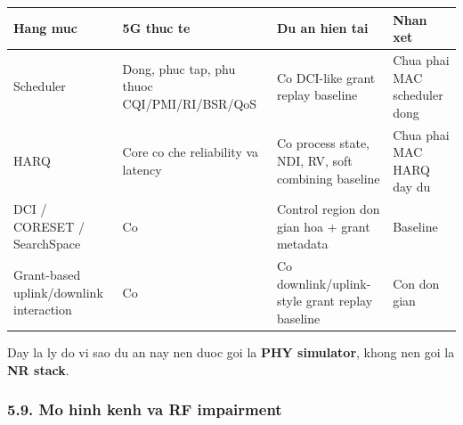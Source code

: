 \documentclass[
  vietnamese,
  a4paper,
  11pt]{article}
\newcounter{none} %
\begin{document}
{\def\LTcaptype{none} %
\begin{longtable}[]{@{}
  >{\raggedright\arraybackslash}p{}
  >{\raggedright\arraybackslash}p{}
  >{\raggedright\arraybackslash}p{}
  >{\raggedright\arraybackslash}p{}@{}}
\toprule\noalign{}
\begin{minipage}[b]{\linewidth}\raggedright
Hang muc
\end{minipage} & \begin{minipage}[b]{\linewidth}\raggedright
5G thuc te
\end{minipage} & \begin{minipage}[b]{\linewidth}\raggedright
Du an hien tai
\end{minipage} & \begin{minipage}[b]{\linewidth}\raggedright
Nhan xet
\end{minipage} \\
\midrule\noalign{}
\endhead
\bottomrule\noalign{}
\endlastfoot
Scheduler & Dong, phuc tap, phu thuoc CQI/PMI/RI/BSR/QoS & Co
DCI-like grant replay baseline & Chua phai MAC scheduler dong \\
HARQ & Core co che reliability va latency & Co process state, NDI, RV,
soft combining baseline & Chua phai MAC HARQ day du \\
DCI / CORESET / SearchSpace & Co & Control region don gian hoa + grant
metadata & Baseline \\
Grant-based uplink/downlink interaction & Co & Co downlink/uplink-style
grant replay baseline & Con don gian \\
\end{longtable}
}

Day la ly do vi sao du an nay nen duoc goi la \textbf{PHY simulator},
khong nen goi la \textbf{NR stack}.

\subsubsection{5.9. Mo hinh kenh va RF
impairment}\label{mo-hinh-kenh-va-rf-impairment}
\end{document}
